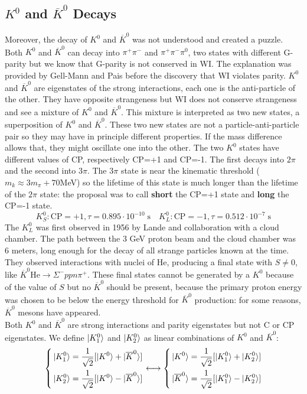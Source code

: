 \documentclass[10.75pt,a4paper,openright,bottom=2cm]{article}
\begin{document}
\subsection{$K^0$ and $\overline{K}^0$ Decays}
Moreover, the decay of $K^0$ and $\overline{K}^0$ was not understood and created a puzzle. Both $K^0$ and $\overline{K}^0$ can decay into $\pi^+\pi^-$ and $\pi^+\pi^-\pi^0$, two states with different G-parity but we know that G-parity is not conserved in WI. The explanation was provided by Gell-Mann and Pais before the discovery that WI violates parity. $K^0$ and $\overline{K}^0$ are eigenstates of the strong interactions, each one is the anti-particle of the other. They have opposite strangeness but WI does not conserve strangeness and see a mixture of $K^0$ and $\overline{K}^0$. This mixture is interpreted as two new states, a superposition of $K^0$ and $\overline{K}^0$. These two new states are not a particle-anti-particle pair so they may have in principle different properties. If the mass difference allows that, they might oscillate one into the other. The two $K^0$ states have different values of CP, respectively CP=+1 and CP=-1. The first decays into $2\pi$ and the second into $3\pi$. The $3\pi$ state is near the kinematic threshold ($m_k\approx3m_\pi+70$\;MeV) so the lifetime of this state is much longer than the lifetime of the $2\pi$ state: the proposal was to call \textbf{short} the CP=+1 state and \textbf{long} the CP=-1 state.
\[
K_S^0: \text{CP}=+1, \tau=0.895\cdot10^{-10}\;\text{s} \quad K_L^0: \text{CP}=-1, \tau=0.512\cdot10^{-7}\;\text{s}
\]
The $K_L^0$ was first observed in 1956 by Lande and collaboration with a cloud chamber. The path between the 3 GeV proton beam and the cloud chamber was 6 meters, long enough for the decay of all strange particles known at the time. They observed interactions with nuclei of He, producing a final state with $S\neq0$, like $\overline{K}^0 \text{He}\to\Sigma^-ppn\pi^+$. These final states cannot be generated by a $K^0$ because of the value of $S$ but no $\overline{K}^0$ should be present, because the primary proton energy was chosen to be below the energy threshold for $\overline{K}^0$ production: for some reasons, $\overline{K}^0$ mesons have appeared.\\
Both $K^0$ and $\overline{K}^0$ are strong interactions and parity eigenstates but not C or CP eigenstates. We define $\ket{K_1^0}$ and $\ket{K_2^0}$ as linear combinations of $K^0$ and $\overline{K}^0$:
\[
\left\{
\begin{aligned}
&\ket{K_1^0}=\frac{1}{\sqrt{2}}[\ket{K^0}+\ket{\overline{K}^0}]\\    
&\ket{K_2^0}=\frac{1}{\sqrt{2}}[\ket{K^0}-\ket{\overline{K}^0}]
\end{aligned}
\right.
\longleftrightarrow
\left\{
\begin{aligned}
&\ket{K^0}=\frac{1}{\sqrt{2}}[\ket{K_1^0}+\ket{K_2^0}]\\ 
&\ket{\overline{K}^0}=\frac{1}{\sqrt{2}}[\ket{K_1^0}-\ket{K_2^0}]
\end{aligned}
\right.
\]
\end{document}
